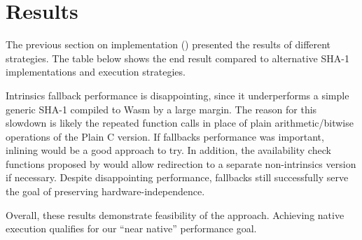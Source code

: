 \section{Results}
\label{sec:results}

The previous section on implementation () presented the
results of different strategies. The table below shows the end result compared
to alternative SHA-1 implementations and execution strategies.

\begin{center}

\end{center}

Intrinsics fallback performance is disappointing, since it underperforms a
simple generic SHA-1 compiled to Wasm by a large margin.
%
The reason for this slowdown is likely the repeated \wasm function calls in
place of plain arithmetic/bitwise operations of the Plain C version. If
fallbacks performance was important, inlining would be a good approach to try.
%
In addition, the availability check functions proposed by
 would allow redirection to a separate non-intrinsics
version if necessary.
%
Despite disappointing performance, fallbacks still successfully serve the goal
of preserving \wasm hardware-independence.

Overall, these results demonstrate feasibility of the approach. Achieving
\MetricInlineWasmtimeHwwasmDivNative native execution qualifies for our ``near
native'' performance goal.
